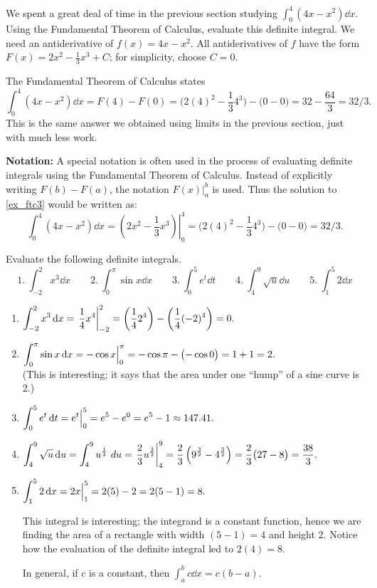 \begin{example}\label{ex_ftc3}%
We spent a great deal of time in the previous section studying $\int_0^4(4x-x^2)\dd x$. Using the Fundamental Theorem of Calculus, evaluate this definite integral.
\solution
We need an antiderivative of $f(x)=4x-x^2$. All antiderivatives of $f$ have the form $F(x) = 2x^2-\frac13x^3+C$; for simplicity, choose $C=0$.

The Fundamental Theorem of Calculus states
\[
\int_0^4(4x-x^2)\dd x = F(4)-F(0)
= \bigl(2(4)^2-\frac134^3\bigr)-\bigl(0-0\bigr) = 32-\frac{64}3 = 32/3.
\]
This is the same answer we obtained using limits in the previous section, just with much less work.
\end{example}

\textbf{Notation:}%
A special notation is often used in the process of evaluating definite integrals using the Fundamental Theorem of Calculus. Instead of explicitly writing $F(b)-F(a)$, the notation $F(x)\Big|_a^b$ is used. Thus the solution to \autoref{ex_ftc3} would be written as:
\[
\int_0^4(4x-x^2)\dd x = \left.\left(2x^2-\frac13x^3\right)\right|_0^4
= \bigl(2(4)^2-\frac134^3\bigr)-\bigl(0-0\bigr) =  32/3.
\]

\begin{example}\label{ex_ftc4}%
Evaluate the following definite integrals.
\[
1.\ \int_{-2}^2 x^3\dd x \qquad 2.\ \int_0^\pi \sin x\dd x \qquad
3.\ \int_0^5 e^t\dd t \qquad 4.\ \int_4^9 \sqrt{u}\dd u\qquad 5.\ \int_1^5 2\dd x
\]
\vspace{-10pt}
\solution
\begin{enumerate}
\item	$\displaystyle \int_{-2}^2 x^3\operatorname{d}\! x = \left.\frac14x^4\right|_{-2}^2 = \left(\frac142^4\right) - \left(\frac14(-2)^4\right) = 0.$
\item	$\displaystyle \int_0^\pi \sin x\operatorname{d}\! x = -\cos x\Big|_0^\pi = -\cos \pi- \bigl(-\cos 0\bigr) = 1+1=2.$ \\
(This is interesting; it says that the area under one ``hump'' of a sine curve is 2.)
\item	$\displaystyle \int_0^5e^t\operatorname{d}\! t = e^t\Big|_0^5 = e^5 - e^0 = e^5-1 \approx 147.41.$
\item	$\displaystyle \int_4^9 \sqrt{u}\operatorname{d}\! u = \int_4^9 u^\frac12\ du = \left.\frac23u^\frac32\right|_4^9 = \frac23\left(9^\frac32-4^\frac32\right) = \frac23\bigl(27-8\bigr) =\frac{38}3.$
\item	$\displaystyle \int_1^5 2\operatorname{d}\! x = 2x\Big|_1^5 = 2(5)-2=2(5-1)=8.$ 

This integral is interesting; the integrand is a constant function, hence we are finding the area of a rectangle with width $(5-1)=4$ and height 2. Notice how the evaluation of the definite integral led to $2(4)=8$. 

In general, if $c$ is a constant, then $\int_a^b c\dd x = c(b-a)$.
\end{enumerate}
\end{example}

